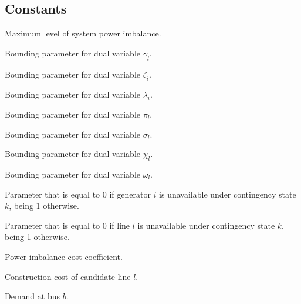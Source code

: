 \subsection{Constants}
\begin{description}

\item[$\overline{\Delta}$] Maximum level of system power imbalance.

\item[$\overline{\gamma}_{l}$] Bounding parameter for dual variable ${\gamma}_{l}$.
\vspace{0.1cm}
\item[$\overline{\zeta}_{i}$] Bounding parameter for dual variable ${\zeta}_{i}$.
\vspace{0.1cm}

\item[$\overline{\lambda}_{i}$] Bounding parameter for dual variable ${\lambda}_{i}$.

\item[$\overline{\pi}_{l}$] Bounding parameter for dual variable ${\pi}_{l}$.

\item[$\overline{\sigma}_{l}$] Bounding parameter for dual variable ${\sigma}_{l}$.

\item[$\overline{\chi}_{l}$] Bounding parameter for dual variable ${\chi}_{l}$.

\item[$\overline{\omega}_{l}$] Bounding parameter for dual variable ${\omega}_{l}$.

\item[$A^{k}_{i}$] Parameter that is equal to 0 if generator $i$ is unavailable under contingency state $k$, being 1 otherwise.

\item[$A^{k}_{l}$] Parameter that is equal to 0 if line $l$ is unavailable under contingency state $k$, being 1 otherwise.

\item[$C^{I}$] Power-imbalance cost coefficient.

\item[$C_{l}$] Construction cost of candidate line $l$.

\item[$D_{b}$] Demand at bus $b$.


\end{description}
